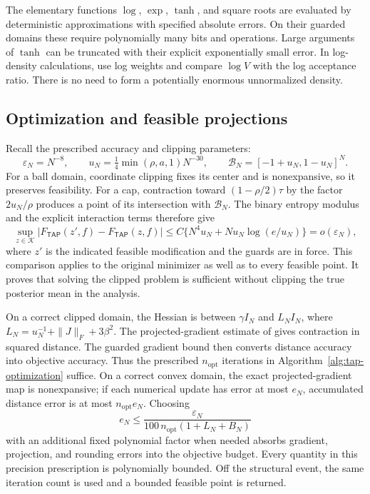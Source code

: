 \documentclass[11pt,reqno]{amsart}
\def\tap{{\mathsf{TAP}}}
\begin{document}
The elementary functions $\log$, $\exp$, $\tanh$, and square roots are evaluated by deterministic approximations with specified absolute errors. On their guarded domains these require polynomially many bits and operations. Large arguments of $\tanh$ can be truncated with their explicit exponentially small error. In log-density calculations, use log weights and compare $\log V$ with the log acceptance ratio. There is no need to form a potentially enormous unnormalized density.

\subsection{Optimization and feasible projections}

Recall the prescribed accuracy and clipping parameters:
\[
 \varepsilon_N=N^{-8},\qquad
 u_N=\tfrac14\min(\rho,a,1)N^{-30},\qquad
 \mathcal B_N=[-1+u_N,1-u_N]^N.
\]
For a ball domain, coordinate clipping fixes its center and is nonexpansive, so it preserves feasibility. For a cap, contraction toward $(1-\rho/2)\tau$ by the factor $2u_N/\rho$ produces a point of its intersection with $\mathcal B_N$. The binary entropy modulus and the explicit interaction terms therefore give
\[
 \sup_{z\in\mathcal K}| F_{\tap}(z',f)- F_{\tap}(z,f)|
 \le C\{N^4u_N+Nu_N\log(e/u_N)\}
 =o(\varepsilon_N),
\]
where $z'$ is the indicated feasible modification and the guards are in force. This comparison applies to the original minimizer as well as to every feasible point. It proves that solving the clipped problem is sufficient without clipping the true posterior mean in the analysis.

On a correct clipped domain, the Hessian is between $\gamma I_N$ and $L_NI_N$, where $L_N=u_N^{-1}+\|J\|_F+3\beta^2$. The projected-gradient estimate of \cite[Theorem~3.10]{bubeck2015convex} gives contraction in squared distance. The guarded gradient bound then converts distance accuracy into objective accuracy. Thus the prescribed $n_{\mathrm{opt}}$ iterations in Algorithm~\ref{alg:tap-optimization} suffice. On a correct convex domain, the exact projected-gradient map is nonexpansive; if each numerical update has error at most $e_N$, accumulated distance error is at most $n_{\mathrm{opt}}e_N$. Choosing
\[
 e_N\le\frac{\varepsilon_N}
 {100\,n_{\mathrm{opt}}(1+L_N+B_N)}
\]
with an additional fixed polynomial factor when needed absorbs gradient, projection, and rounding errors into the objective budget. Every quantity in this precision prescription is polynomially bounded. Off the structural event, the same iteration count is used and a bounded feasible point is returned.
\end{document}

